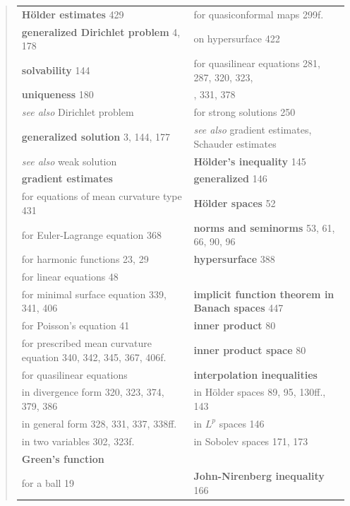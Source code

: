 \begin{quote}
\begin{tabular}{@{}p{}p{}@{}}
\quad \textbf{Hölder estimates} \hfill 429 &
\quad for quasiconformal maps \hfill 299f. \\
\textbf{generalized Dirichlet problem} \hfill 4, 178 &
\quad on hypersurface \hfill 422 \\
\quad \textbf{solvability} \hfill 144 &
\quad for quasilinear equations \hfill 281, 287, 320, 323, \\
\quad \textbf{uniqueness} \hfill 180 &
\quad 328, 331, 378 \\
\quad \emph{see also} Dirichlet problem &
\quad for strong solutions \hfill 250 \\
\textbf{generalized solution} \hfill 3, 144, 177 &
\quad \emph{see also} gradient estimates, Schauder estimates \\
\quad \emph{see also} weak solution &
\textbf{Hölder's inequality} \hfill 145 \\
\textbf{gradient estimates} &
\quad \textbf{generalized} \hfill 146 \\
\quad for equations of mean curvature type \hfill 431 &
\textbf{Hölder spaces} \hfill 52 \\
\quad for Euler-Lagrange equation \hfill 368 &
\quad \textbf{norms and seminorms} \hfill 53, 61, 66, 90, 96 \\
\quad for harmonic functions \hfill 23, 29 &
\textbf{hypersurface} \hfill 388 \\
\quad for linear equations \hfill 48 &
\\
\quad for minimal surface equation \hfill 339, 341, 406 &
\textbf{implicit function theorem in Banach spaces} \hfill 447 \\
\quad for Poisson's equation \hfill 41 &
\textbf{inner product} \hfill 80 \\
\quad for prescribed mean curvature equation \hfill 340, 342, 345, 367, 406f. &
\textbf{inner product space} \hfill 80 \\
\quad for quasilinear equations &
\textbf{interpolation inequalities} \\
\quad \quad in divergence form \hfill 320, 323, 374, 379, 386 &
\quad in Hölder spaces \hfill 89, 95, 130ff., 143 \\
\quad \quad in general form \hfill 328, 331, 337, 338ff. &
\quad in $L^p$ spaces \hfill 146 \\
\quad \quad in two variables \hfill 302, 323f. &
\quad in Sobolev spaces \hfill 171, 173 \\
\textbf{Green's function} &
\\
\quad for a ball \hfill 19 &
\textbf{John-Nirenberg inequality} \hfill 166 \\

\end{tabular}
\end{quote}
